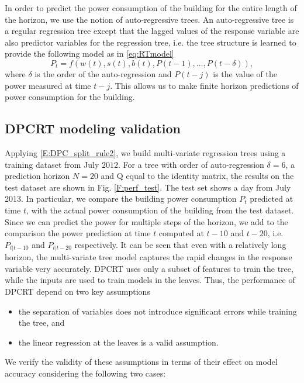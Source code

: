 In order to predict the power consumption of the building for the entire length of the horizon, we use the notion of auto-regressive trees. An auto-regressive tree is a regular regression tree except that the lagged values of the response variable are also predictor variables for the regression tree, i.e. the tree structure is learned to provide the following model as in \eqref{eq:RTmodel}
\begin{equation}\label{eq:building_model}
P_t = f \left( w(t), s(t), b(t), P(t-1),\dots, P(t-\delta) \right),
\end{equation}
where $\delta$ is the order of the auto-regression and $P(t-j)$ is the value of the power measured at time $t-j$. 
This allows us to make finite horizon predictions of power consumption for the building.

\subsection{DPCRT modeling validation}

Applying \eqref{E:DPC_split_rule2}, we build multi-variate regression trees using a training dataset from July $2012$. 
For a tree with order of auto-regression $\delta = 6$, a prediction horizon $N = 20$ and $\mathrm{Q}$ equal to the identity matrix, the results on the test dataset are shown in Fig. \ref{F:perf_test}. 
The test set shows a day from July 2013. 
In particular, we compare the building power consumption $P_t$ predicted at time $t$, with the actual power consumption of the building from the test dataset. 
Since we can predict the power for multiple steps of the horizon, we add to the comparison the power prediction at time $t$ computed at $t-10$ and $t-20$, i.e. $P_{t|t-10}$ and $P_{t|t-20}$ respectively. 
It can be seen that even with a relatively long horizon, the multi-variate tree model captures the rapid changes in the response variable very accurately. 
DPCRT uses only a subset of features to train the tree, while the inputs are used to train models in the leaves. Thus, the performance of DPCRT depend on two key assumptions
\begin{itemize}[leftmargin=0.5cm]
	\item the separation of variables does not introduce significant errors while training the tree, and
	\item the linear regression at the leaves is a valid assumption.
\end{itemize}
We verify the validity of these assumptions in terms of their effect on model accuracy considering the following two cases:

